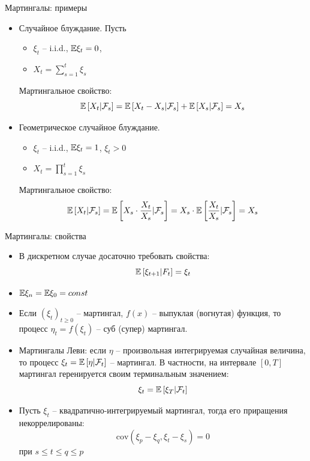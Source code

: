 \documentclass{beamer}
\begin{document}
\begin{frame}{Мартингалы: примеры}
    \begin{itemize}
        \item Случайное блуждание. Пусть
        \begin{itemize}
            \item $\xi_t$ -- i.i.d., $\mathbb{E} \xi_t =0$,
            \item $X_t = \sum_{s=1}^{t}\xi_s$
        \end{itemize}
    Мартингальное свойство:
    $$
        \mathbb{E} \left[ X_t | \mathcal{F}_s\right]
        = \mathbb{E} \left[ X_t - X_s | \mathcal{F}_s\right]
        + \mathbb{E} \left[ X_s | \mathcal{F}_s\right] = X_s
    $$
    \item Геометрическое случайное блуждание. 
    \begin{itemize}
        \item $\xi_t$ -- i.i.d., $\mathbb{E} \xi_t = 1$, $\xi_t > 0$
        \item $X_t = \prod_{s=1}^t \xi_s$
    \end{itemize}
    Мартингальное свойство:
    $$
        \mathbb{E} \left[ X_t | \mathcal{F}_s\right]
        = \mathbb{E} \left[ X_s \cdot \dfrac{X_t}{X_s} | \mathcal{F}_s\right]
        = X_s \cdot \mathbb{E} \left[ \dfrac{X_t}{X_s} | \mathcal{F}_s\right] = X_s
    $$
    \end{itemize}
\end{frame}

\begin{frame}{Мартингалы: свойства}
    \begin{itemize}
        \item В дискретном случае досаточно требовать свойства:
        $$
            \mathbb{E} \left[ \xi_{t+1} | F_{t}\right] = \xi_t
        $$
        \item $\mathbb{E} \xi_n = \mathbb{E} \xi_0 = const$
        \item Если $(\xi_t)_{t\geq 0}$ -- мартингал, $f(x)$ -- выпуклая (вогнутая) функция, то процесс $\eta_t = f(\xi_t)$ -- суб (супер) мартингал.
        \item Мартингалы Леви: если $\eta$ -- произвольная интегрируемая случайная величина, то процесс $\xi_t = \mathbb{E} \left[ \eta|\mathcal{F}_t\right]$ -- мартингал. В частности, на интервале $[0, T]$ мартингал геренируется своим терминальным значением:
        $$
            \xi_t = \mathbb{E} \left[ \xi_T | \mathcal{F}_t \right]
        $$
        \item Пусть $\xi_t$ -- квадратично-интегрируемый мартингал, тогда его приращения некоррелированы:
        $$
            \mathrm{cov} (\xi_p - \xi_q, \xi_t - \xi_s) = 0
        $$ при $s \leq t \leq q \leq p$
    \end{itemize} 
\end{frame}
\end{document}
